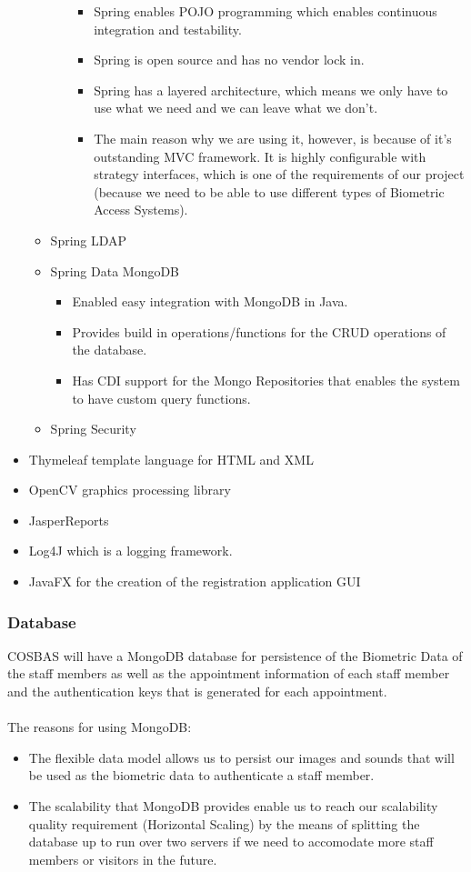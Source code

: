 \begin{itemize}
\begin{itemize}
\begin{itemize}
\begin{itemize}
						\item Spring enables POJO programming which enables continuous integration and testability.
						\item Spring is open source and has no vendor lock in.
						\item Spring has a layered architecture, which means we only have to use what we need and we can leave what we don't.
						\item The main reason why we are using it, however, is because of it's outstanding MVC framework. It is highly configurable with strategy interfaces, which is one of the requirements of our project (because we need to be able to use different types of Biometric Access Systems).
					\end{itemize}
					
				\end{itemize}
			\item Spring LDAP
			\item Spring Data MongoDB
				\begin{itemize}
					\item Enabled easy integration with MongoDB in Java.
					\item Provides build in operations/functions for the CRUD operations of the database.
					\item Has CDI support for the Mongo Repositories that enables the system to have custom query functions.
				\end{itemize}
			\item Spring Security
		\end{itemize}
	\item Thymeleaf template language for HTML and XML
	\item OpenCV graphics processing library
	\item JasperReports
	\item Log4J which is a logging framework.
	\item JavaFX for the creation of the registration application GUI
\end{itemize}

\subsubsection{Database}
COSBAS will have a MongoDB database for persistence of the Biometric Data of the staff members as well as the appointment information of each staff member and the authentication keys that is generated for each appointment. \\
\\
The reasons for using MongoDB:
	\begin{itemize}
		\item The flexible data model allows us to persist our images and sounds that will be used as the biometric data to authenticate a staff member.
		\item The scalability that MongoDB provides enable us to reach our scalability quality requirement (Horizontal Scaling) by the means of splitting the database up to run over two servers if we need to accomodate more staff members or visitors in the future.
	\end{itemize}

